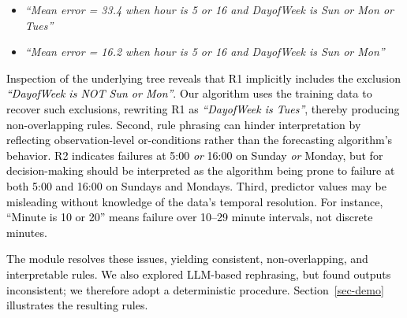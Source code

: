 \documentclass[12pt]{article}
\newcommand{\galit}[1]{\textcolor{black}{#1}}
\newcommand{\matt}[1]{\textcolor{black}{#1}}
\begin{document}
{
\begin{itemize}
    \setlength{\itemsep}{0pt}
    \setlength{\parskip}{0pt}
    \setlength{\topsep}{2pt}
    \item[(R1)] \textit{``Mean error = 33.4 when hour is 5 or 16 and DayofWeek is Sun or Mon or Tues''}
    \item[(R2)] \textit{``Mean error = 16.2 when hour is 5 or 16 and DayofWeek is Sun or Mon''}
\end{itemize}}
\matt{Inspection of the underlying tree reveals that R1 implicitly includes the exclusion \textit{``DayofWeek is NOT Sun or Mon''}. Our algorithm uses the training data to recover such exclusions, rewriting R1 as \textit{``DayofWeek is Tues''}, thereby producing non-overlapping rules. Second, rule phrasing can hinder interpretation by reflecting observation-level or-conditions rather than the forecasting algorithm’s behavior. R2 indicates failures at 5:00 \emph{or} 16:00 on Sunday \emph{or} Monday, but for decision-making should be interpreted as the algorithm being prone to failure at both 5:00 and 16:00 on Sundays and Mondays. Third, predictor values may be misleading without knowledge of the data’s temporal resolution. For instance, “Minute is 10 or 20” \galit{means} %
failure over 10–29 minute intervals, not discrete minutes.}

\matt{The module resolves these issues, yielding consistent, non-overlapping, and interpretable rules. We also explored LLM-based rephrasing, but found outputs inconsistent; we therefore adopt a deterministic procedure. Section~\ref{sec-demo} illustrates the resulting rules.}


\end{document}
